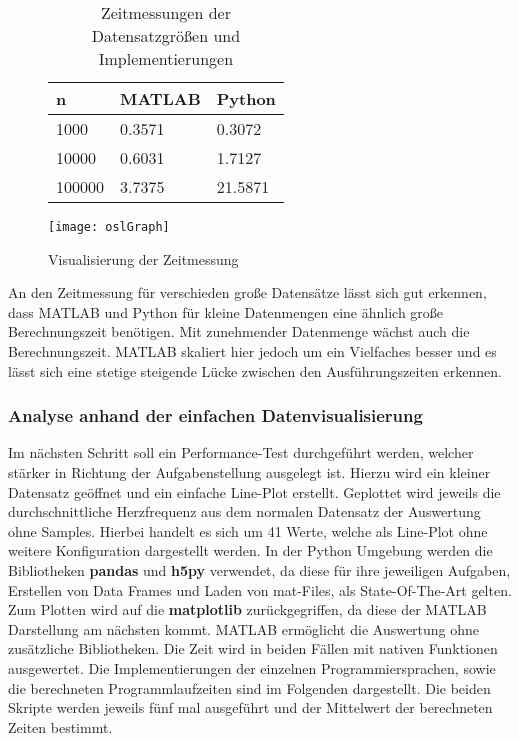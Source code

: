 \begin{figure}[H]
	\begin{minipage}[b]{.4\linewidth} %
		\begin{table}[H]
			\begin{tabular}{|l|l|l|}
				\hline
				\textbf{n} & \textbf{MATLAB} & \textbf{Python} \\ \hline
				1000       & 0.3571               & 0.3072               \\ \hline
				10000      & 0.6031               & 1.7127               \\ \hline
				100000     & 3.7375               & 21.5871              \\ \hline
			\end{tabular}
			\caption{Zeitmessungen der Datensatzgrößen und Implementierungen}
		\end{table}
	\end{minipage}
	\hspace{.1\linewidth}%
	\begin{minipage}[b]{.4\linewidth} %
		\texttt{[image: oslGraph]}
		\caption{Visualisierung der Zeitmessung}
	\end{minipage}
\end{figure}

An den Zeitmessung für verschieden große Datensätze lässt sich gut erkennen, dass MATLAB und Python für kleine Datenmengen eine ähnlich große Berechnungszeit benötigen. Mit zunehmender Datenmenge wächst auch die Berechnungszeit. MATLAB skaliert hier jedoch um ein Vielfaches besser und es lässt sich eine stetige steigende Lücke zwischen den Ausführungszeiten erkennen.\cite{olsMatPy}

\subsubsection{Analyse anhand der einfachen Datenvisualisierung}

Im nächsten Schritt soll ein Performance-Test durchgeführt werden, welcher stärker in Richtung der Aufgabenstellung ausgelegt ist. Hierzu wird ein kleiner Datensatz geöffnet und ein einfache Line-Plot erstellt. Geplottet wird jeweils die durchschnittliche Herzfrequenz aus dem normalen Datensatz der Auswertung ohne Samples. Hierbei handelt es sich um 41 Werte, welche als Line-Plot ohne weitere Konfiguration dargestellt werden. In der Python Umgebung werden die Bibliotheken \textbf{pandas} und \textbf{h5py} verwendet, da diese für ihre jeweiligen Aufgaben, Erstellen von Data Frames und Laden von mat-Files, als State-Of-The-Art gelten. Zum Plotten wird auf die \textbf{matplotlib} zurückgegriffen, da diese der MATLAB Darstellung am nächsten kommt. MATLAB ermöglicht die Auswertung ohne zusätzliche Bibliotheken. Die Zeit wird in beiden Fällen mit nativen Funktionen ausgewertet. Die Implementierungen der einzelnen Programmiersprachen, sowie die berechneten Programmlaufzeiten sind im Folgenden dargestellt. Die beiden Skripte werden jeweils fünf mal ausgeführt und der Mittelwert der berechneten Zeiten bestimmt.\cite{pandas}\cite{h5py}


